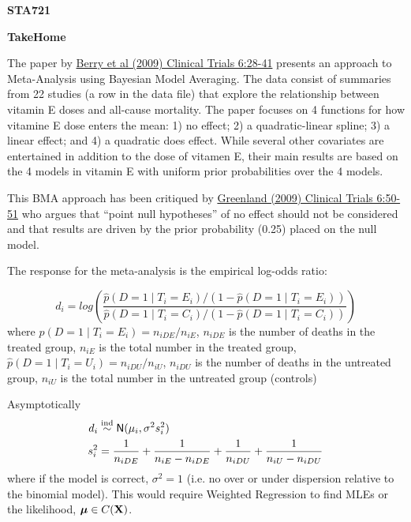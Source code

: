 \documentclass[12pt]{article}
\begin{document}
{\bf STA721}
\vspace{.1in}
\begin{center}
{\large \bf TakeHome} \\
\end{center}

The paper by
\href{http://search.proquest.com.proxy.lib.duke.edu/docview/220285502/781DFACF0348441BPQ/1?accountid=10598}{Berry
  et al (2009) Clinical Trials 6:28-41}
presents an approach to Meta-Analysis using Bayesian Model Averaging.
The data consist of summaries from 22 studies (a row in the data file)
that explore the relationship between  vitamin E doses and all-cause
mortality.  The paper  focuses on 4 functions for how vitamine E dose
enters the mean:
1) no effect; 2) a quadratic-linear spline; 3) a linear effect; and 4)
a quadratic does effect.  While several other covariates are
entertained in addition to the dose of vitamen E, their main results are
based on the 4 models in vitamin E with uniform prior probabilities
over the 4 models.

This BMA approach has been critiqued by 
\href{http://search.proquest.com.proxy.lib.duke.edu/docview/220281455/fulltextPDF/4857C29367D34842PQ/2?accountid=10598}{
  Greenland (2009) Clinical Trials 6:50-51}
who argues that ``point null hypotheses'' of no effect should not be
considered and that results are driven by the prior probability (0.25)
placed on the null model.

The response for the meta-analysis is the empirical log-odds ratio:

$$ d_i = log\left( \frac{\hat{p}(D=1 \mid T_i=E_i)/(1 - \hat{ p}(D=1 \mid T_i=E_i))}
{\hat{p}(D=1 \mid T_i=C_i)/(1 - \hat{p}(D=1 \mid T_i=C_i))}\right)
$$
where $\hat{p}(D=1 \mid T_i=E_i) = n_{i D E}/n_{i E}$, $n_{i D E}$ is
the number of deaths in the treated group, $n_{i E}$ is the total
number in the treated group, $\hat{p}(D=1 \mid T_i=U_i) = n_{i D U}/n_{i U}$, $n_{i D U}$ is
the number of deaths in the untreated group, $n_{i U}$ is the total
number in the untreated group (controls)

Asymptotically
\begin{align}
d_i  & \mathrel{\mathop{\sim}\limits^{\rm ind}} \textsf{N}(\mu_i, \sigma^2 s_i^2)  \\
s_i^2 & = \frac{1}{n_{i D E}} + \frac{1}{n_{i E} - n_{i D E}} +
 \frac{1}{n_{i D U}} + \frac{1}{n_{i U} - n_{i D U}} 
\end{align}
where if the model is correct, $\sigma^2 = 1$ (i.e. no over or under
dispersion relative to the binomial model).   This would require
Weighted Regression to find MLEs or the likelihood, $\boldsymbol{\mu} \in C(\mathbf{X})$.
\end{document}
